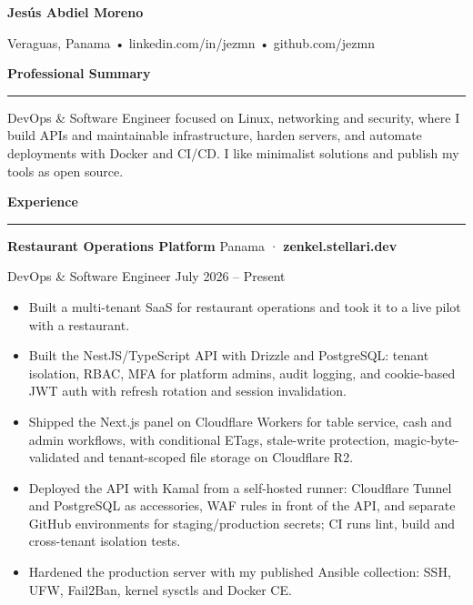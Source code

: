\documentclass[
]{article}
\author{}
\date{}
\newcommand{\sect}[1]{\vspace{4pt}\noindent\textbf{#1}\par\vspace{-2pt}\noindent\rule{\linewidth}{0.4pt}\par\vspace{2pt}}
\begin{document}
\begin{center}
{\LARGE \textbf{Jesús Abdiel Moreno}}\\
\vspace*{10pt}

Veraguas, Panama • linkedin.com/in/jezmn • github.com/jezmn
\end{center}
\vspace*{10pt}

\sect{Professional Summary}
\vspace*{10pt}
DevOps \& Software Engineer focused on Linux, networking and security, where I build APIs and
maintainable infrastructure, harden servers, and automate deployments with Docker and CI/CD. I like
minimalist solutions and publish my tools as open source.
\vspace*{15pt}

\sect{Experience}
\vspace*{10pt}

\textbf{Restaurant Operations Platform} \hfill Panama · \textbf{zenkel.stellari.dev}

DevOps \& Software Engineer \hfill July 2026 -- Present
\vspace*{10pt}

\begin{itemize}
\item
  Built a multi-tenant SaaS for restaurant operations and took it to a live
  pilot with a restaurant.
\item
  Built the NestJS/TypeScript API with Drizzle and PostgreSQL: tenant isolation,
  RBAC, MFA for platform admins, audit logging, and cookie-based JWT auth with
  refresh rotation and session invalidation.
\item
  Shipped the Next.js panel on Cloudflare Workers for table service, cash and
  admin workflows, with conditional ETags, stale-write protection,
  magic-byte-validated and tenant-scoped file storage on Cloudflare R2.
\item
  Deployed the API with Kamal from a self-hosted runner: Cloudflare Tunnel and
  PostgreSQL as accessories, WAF rules in front of the API, and separate GitHub
  environments for staging/production secrets; CI runs lint, build and
  cross-tenant isolation tests.
\item
  Hardened the production server with my published Ansible collection:
  SSH, UFW, Fail2Ban, kernel sysctls and Docker CE.
\end{itemize}
\vspace*{10pt}
\end{document}
